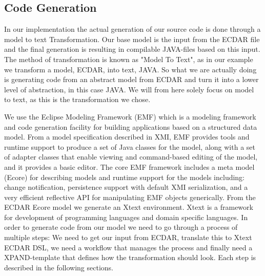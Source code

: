 \subsection{Code Generation \label{implementation-code-generation}}
In our implementation the actual generation of our source code is done through a model to text Transformation. Our base model is the input from the ECDAR file and the final generation is resulting in compilable JAVA-files based on this input. The method of transformation is known as "Model To Text", as in our example we transform a model, ECDAR, into text, JAVA. So what we are actually doing is generating code from an abstract model from ECDAR and turn it into a lower level of abstraction, in this case JAVA. We will from here solely focus on model to text, as this is the transformation we chose.
\newline

We use the Eclipse Modeling Framework (EMF) which is a modeling framework and code generation facility for building applications based on a structured data model. From a model specification described in XMI, EMF provides tools and runtime support to produce a set of Java classes for the model, along with a set of adapter classes that enable viewing and command-based editing of the model, and it provides a basic editor.
The core EMF framework includes a meta model (Ecore) for describing models and runtime support for the models including: change notification, persistence support with default XMI serialization, and a very efficient reflective API for manipulating EMF objects generically. From the ECDAR Ecore model we generate an Xtext environment. Xtext is a framework for development of programming languages and domain specific languages. 
\newline
In order to generate code from our model we need to go through a process of multiple steps: We need to get our input from ECDAR, translate this to Xtext ECDAR DSL, we need a workflow that manages the process and finally need a XPAND-template that defines how the transformation should look. Each step is described in the following sections.

